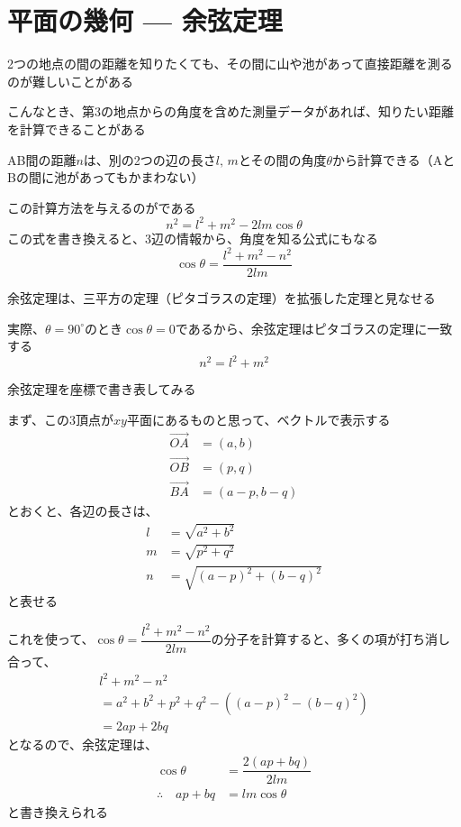 \documentclass[../book_jiriki_calc]{subfiles}
\begin{document}
\section{平面の幾何 --- 余弦定理}

2つの地点の間の距離を知りたくても、その間に山や池があって直接距離を測るのが難しいことがある

こんなとき、第3の地点からの角度を含めた測量データがあれば、知りたい距離を計算できることがある

\sectionline

AB間の距離$n$は、別の2つの辺の長さ$l,\,m$とその間の角度$\theta$から計算できる（AとBの間に池があってもかまわない）

この計算方法を与えるのがである
\begin{equation*}
  n^2 = l^2 + m^2 - 2lm\cos\theta
\end{equation*}
この式を書き換えると、3辺の情報から、角度を知る公式にもなる
\begin{equation*}
  \cos\theta = \frac{l^2 + m^2 - n^2}{2lm}
\end{equation*}

\br

余弦定理は、三平方の定理（ピタゴラスの定理）を拡張した定理と見なせる

実際、$\theta = 90^\circ$のとき$\cos\theta = 0$であるから、余弦定理はピタゴラスの定理に一致する
\begin{equation*}
  n^2 = l^2 + m^2
\end{equation*}

\sectionline

余弦定理を座標で書き表してみる

まず、この3頂点が$xy$平面にあるものと思って、ベクトルで表示する
\begin{align*}
  \overrightarrow{OA} & = (a,b)     \\
  \overrightarrow{OB} & = (p,q)     \\
  \overrightarrow{BA} & = (a-p,b-q)
\end{align*}
とおくと、各辺の長さは、
\begin{align*}
  l & = \sqrt{a^2 + b^2}         \\
  m & = \sqrt{p^2 + q^2}         \\
  n & = \sqrt{(a-p)^2 + (b-q)^2}
\end{align*}
と表せる

これを使って、$\cos\theta = \dfrac{l^2 + m^2 - n^2}{2lm}$の分子を計算すると、多くの項が打ち消し合って、
\begin{multline*}
  l^2 + m^2 - n^2 \\ = a^2 + b^2 + p^2 + q^2 - ((a-p)^2 - (b-q)^2)
  \\ = 2ap + 2bq
\end{multline*}
となるので、余弦定理は、
\begin{align}
  \cos\theta               & = \dfrac{2(ap+bq)}{2lm} \\
  \therefore \quad ap + bq & = lm\cos\theta
\end{align}
と書き換えられる
\end{document}
